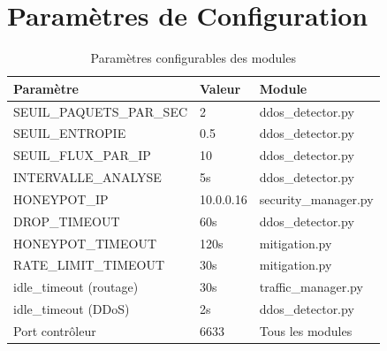 \documentclass[12pt,a4paper]{report}
\begin{document}
\chapter{Paramètres de Configuration}

\begin{table}[H]
\centering
\caption{Paramètres configurables des modules}
\label{tab:params_config}
\begin{tabular}{lll}
\toprule
\textbf{Paramètre} & \textbf{Valeur} & \textbf{Module} \\
\midrule
SEUIL\_PAQUETS\_PAR\_SEC & 2 & ddos\_detector.py \\
SEUIL\_ENTROPIE & 0.5 & ddos\_detector.py \\
SEUIL\_FLUX\_PAR\_IP & 10 & ddos\_detector.py \\
INTERVALLE\_ANALYSE & 5s & ddos\_detector.py \\
HONEYPOT\_IP & 10.0.0.16 & security\_manager.py \\
DROP\_TIMEOUT & 60s & ddos\_detector.py \\
HONEYPOT\_TIMEOUT & 120s & mitigation.py \\
RATE\_LIMIT\_TIMEOUT & 30s & mitigation.py \\
idle\_timeout (routage) & 30s & traffic\_manager.py \\
idle\_timeout (DDoS) & 2s & ddos\_detector.py \\
Port contrôleur & 6633 & Tous les modules \\
\bottomrule
\end{tabular}
\end{table}
\end{document}

